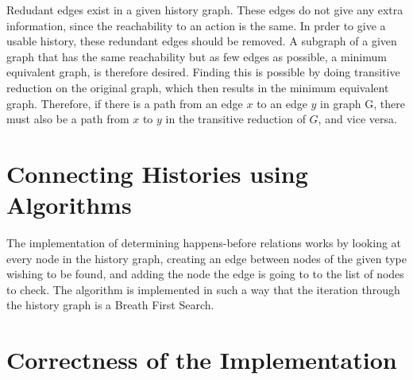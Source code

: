 	Redudant edges exist in a given history graph. These edges do not give any extra information, since the reachability to an action is the same. In prder to give a usable history, these redundant edges should be removed. 
	A subgraph of a given graph that has the same reachability but as few edges as possible, a minimum equivalent graph, is therefore desired. Finding this is possible by doing transitive reduction on the original graph, which then results in the minimum equivalent graph. 
	Therefore, if there is a path from an edge $x$ to an edge $y$ in graph G, there must also be a path from $x$ to $y$ in the transitive reduction of $G$, and vice versa. 
	

	
	\section{Connecting Histories using Algorithms} %
	The implementation of determining happens-before relations works by looking at every node in the history graph, creating an edge between nodes of the given type wishing to be found, and adding the node the edge is going to to the list of nodes to check. The algorithm is implemented in such a way that the iteration through the history graph is a Breath First Search. 
	
	\section{Correctness of the Implementation} %
	